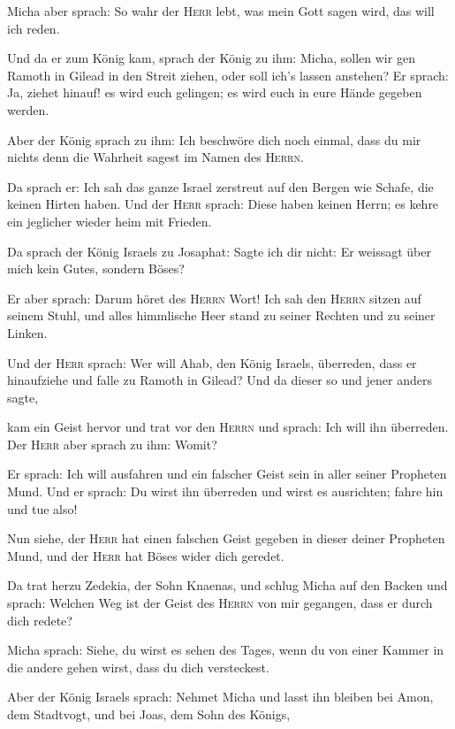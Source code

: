  Micha aber sprach: So wahr der \textsc{Herr} lebt, was
mein Gott sagen wird, das will ich reden.

 Und da er zum König kam, sprach der König zu ihm: Micha,
sollen wir gen Ramoth in Gilead in den Streit ziehen, oder soll ich's
lassen anstehen? Er sprach: Ja, ziehet hinauf! es wird euch gelingen; es
wird euch in eure Hände gegeben werden.

 Aber der König sprach zu ihm: Ich beschwöre dich noch
einmal, dass du mir nichts denn die Wahrheit sagest im Namen des
\textsc{Herrn}.

 Da sprach er: Ich sah das ganze Israel zerstreut auf den
Bergen wie Schafe, die keinen Hirten haben. Und der \textsc{Herr}
sprach: Diese haben keinen Herrn; es kehre ein jeglicher wieder heim mit
Frieden.

 Da sprach der König Israels zu Josaphat: Sagte ich dir
nicht: Er weissagt über mich kein Gutes, sondern Böses?

 Er aber sprach: Darum höret des \textsc{Herrn} Wort! Ich
sah den \textsc{Herrn} sitzen auf seinem Stuhl, und alles himmlische
Heer stand zu seiner Rechten und zu seiner Linken.

 Und der \textsc{Herr} sprach: Wer will Ahab, den König
Israels, überreden, dass er hinaufziehe und falle zu Ramoth in Gilead?
Und da dieser so und jener anders sagte,

 kam ein Geist hervor und trat vor den \textsc{Herrn} und
sprach: Ich will ihn überreden. Der \textsc{Herr} aber sprach zu ihm:
Womit?

 Er sprach: Ich will ausfahren und ein falscher Geist
sein in aller seiner Propheten Mund. Und er sprach: Du wirst ihn
überreden und wirst es ausrichten; fahre hin und tue also!

 Nun siehe, der \textsc{Herr} hat einen falschen Geist
gegeben in dieser deiner Propheten Mund, und der \textsc{Herr} hat Böses
wider dich geredet.

 Da trat herzu Zedekia, der Sohn Knaenas, und schlug
Micha auf den Backen und sprach: Welchen Weg ist der Geist des
\textsc{Herrn} von mir gegangen, dass er durch dich redete?

 Micha sprach: Siehe, du wirst es sehen des Tages, wenn
du von einer Kammer in die andere gehen wirst, dass du dich versteckest.

 Aber der König Israels sprach: Nehmet Micha und lasst
ihn bleiben bei Amon, dem Stadtvogt, und bei Joas, dem Sohn des Königs,

